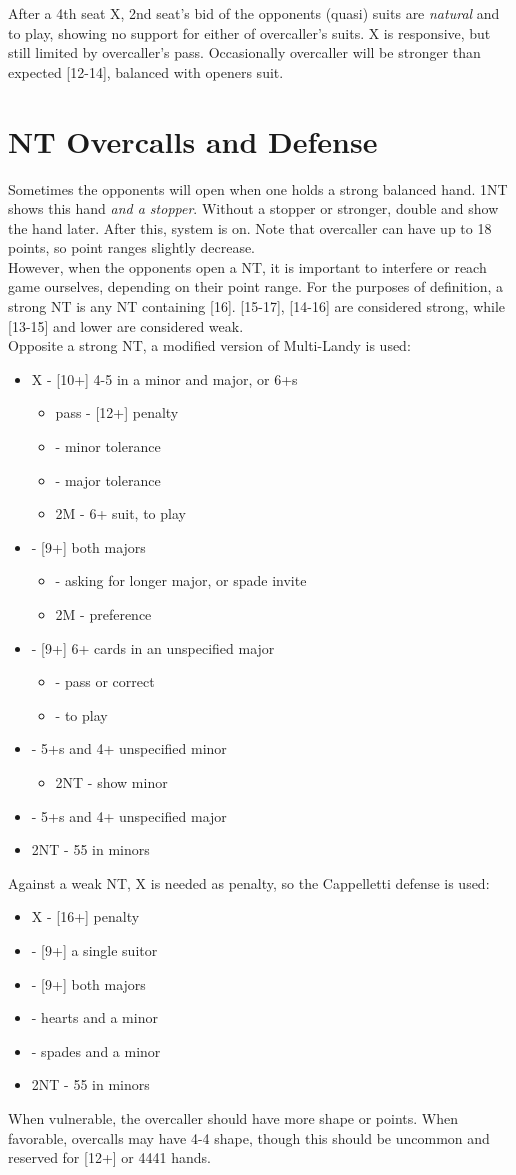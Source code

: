 \documentclass[12pt]{report}
\newcommand{\n}{\\}
\newcommand{\ul}[1]{\begin{itemize}#1\end{itemize}}
\newcommand{\li}{\item[~]}
\begin{document}
    After a 4th seat X, 2nd seat's bid of the opponents (quasi) suits are \textit{natural} and to play, showing no support for either of overcaller's suits.  X is responsive, but still limited by overcaller's pass.  Occasionally overcaller will be stronger than expected [12-14], balanced with openers suit.
\newpage
\section{NT Overcalls and Defense} \label{4:4}

    Sometimes the opponents will open when one holds a strong balanced hand.  1NT shows this hand \textit{and a stopper}.  Without a stopper or stronger, double and show the hand later.  After this, system is on.  Note that overcaller can have up to 18 points, so point ranges slightly decrease.\n

    However, when the opponents open a NT, it is important to interfere or reach game ourselves, depending on their point range.  For the purposes of definition, a strong NT is any NT containing [16].  [15-17], [14-16] are considered strong, while [13-15] and lower are considered weak. \n

    Opposite a strong NT, a modified version of Multi-Landy is used:
    \ul {
        \li X - [10+] 4-5 in a minor and major, or 6+\di{}s
        \ul {
            \li pass - [12+] penalty
            \li \cl2 - minor tolerance
            \li \di2 - major tolerance
            \li 2M - 6+ suit, to play
        }
        \li \cl2 - [9+] both majors
        \ul {
            \li \di2 - asking for longer major, or spade invite
            \li 2M - preference
        }
        \li \di2 - [9+] 6+ cards in an unspecified major
        \ul {
            \li \he2 - pass or correct
            \li \sp2 - to play
        }
        \li \he2 - 5+\he{}s and 4+ unspecified minor
        \ul {
            \li 2NT - show minor
        }
        \li \sp2 - 5+\sp{}s and 4+ unspecified major
        \li 2NT - 55 in minors
    }

    Against a weak NT, X is needed as penalty, so the Cappelletti defense is used:
    \ul {
        \li X - [16+] penalty
        \li {} - [9+] a single suitor
        \li \di2 - [9+] both majors
        \li \he2 - hearts and a minor
        \li \sp2 - spades and a minor
        \li 2NT - 55 in minors
    }

    When vulnerable, the overcaller should have more shape or points.  When favorable, overcalls may have 4-4 shape, though this should be uncommon and reserved for [12+] or 4441 hands. \n
\end{document}
